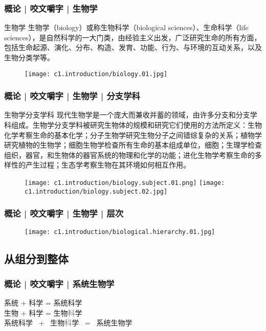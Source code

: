 \begin{frame}
  \frametitle{概论 | 咬文嚼字 | 生物学}
  \begin{block}{生物学}
   生物学（biology）或称生物科学（biological sciences）、生命科学（life sciences），是自然科学的一大门类，由经验主义出发，广泛研究生命的所有方面，包括生命起源、演化、分布、构造、发育、功能、行为、与环境的互动关系，以及生物分类学等。\\
  \end{block}
  \begin{figure}
    \centering
    \texttt{[image: c1.introduction/biology.01.jpg]}
  \end{figure}
\end{frame}

\begin{frame}
  \frametitle{概论 | 咬文嚼字 | 生物学 | 分支学科}
  \begin{block}{生物学分支学科}
现代生物学是一个庞大而兼收并蓄的领域，由许多分支和分支学科组成。生物学分支学科被研究生物体的规模和研究它们使用的方法所定义：生物化学考察生命的基本化学；分子生物学研究生物分子之间错综复杂的关系；植物学研究植物的生物学；细胞生物学检查所有生命的基本组成单位，细胞；生理学检查组织，器官，和生物体的器官系统的物理和化学的功能；进化生物学考察生命的多样性的产生过程；生态学考察生物在其环境如何相互作用。
  \end{block}
  \begin{figure}
    \centering
    \texttt{[image: c1.introduction/biology.subject.01.png]}\qquad
    \texttt{[image: c1.introduction/biology.subject.02.jpg]}
  \end{figure}
\end{frame}

\begin{frame}
  \frametitle{概论 | 咬文嚼字 | 生物学 | 层次}
  \begin{figure}
    \centering
    \texttt{[image: c1.introduction/biological.hierarchy.01.jpg]}
  \end{figure}
\end{frame}

\subsection{从组分到整体}
\begin{frame}
  \frametitle{概论 | 咬文嚼字 | 系统生物学}
  \begin{huge}
  \begin{center}
    \pause
    系统 \quad + \quad 科学 \quad = \quad 系统科学\\  
    \vspace{1em}
    \pause
    生物 \quad + \quad 科学 \quad = \quad 生物\textcolor{gray}{科}学\\ 
    \vspace{1em}
    \pause
    系统科学 \ + \ 生物\textcolor{gray}{科}学 \ = \ 系统生物学
  \end{center}
  \end{huge}
\end{frame}

